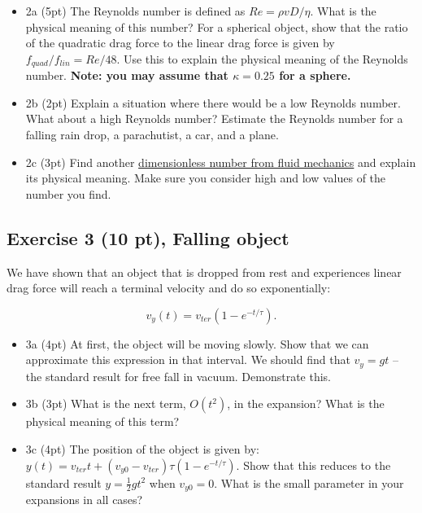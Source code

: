 \documentclass[11pt]{article}
\providecommand{\tightlist}{%
      \setlength{\itemsep}{0pt}\setlength{\parskip}{0pt}}
\begin{document}
\begin{itemize}
\tightlist
\item
  2a (5pt) The Reynolds number is defined as \(Re = \rho v D / \eta\).
  What is the physical meaning of this number? For a spherical object,
  show that the ratio of the quadratic drag force to the linear drag
  force is given by \(f_{quad}/f_{lin} = Re/48\). Use this to explain
  the physical meaning of the Reynolds number. \textbf{Note: you may
  assume that \(\kappa = 0.25\) for a sphere.}
\item
  2b (2pt) Explain a situation where there would be a low Reynolds
  number. What about a high Reynolds number? Estimate the Reynolds
  number for a falling rain drop, a parachutist, a car, and a plane.
\item
  2c (3pt) Find another
  \href{https://en.wikipedia.org/wiki/Dimensionless_numbers_in_fluid_mechanics}{dimensionless
  number from fluid mechanics} and explain its physical meaning. Make
  sure you consider high and low values of the number you find.
\end{itemize}

    \subsection{Exercise 3 (10 pt), Falling
object}\label{exercise-3-10-pt-falling-object}

We have shown that an object that is dropped from rest and experiences
linear drag force will reach a terminal velocity and do so
exponentially:

\[v_y(t) = v_{ter}(1-e^{-t/\tau}).\]

\begin{itemize}
\tightlist
\item
  3a (4pt) At first, the object will be moving slowly. Show that we can
  approximate this expression in that interval. We should find that
  \(v_y = gt\) -- the standard result for free fall in vacuum.
  Demonstrate this.
\item
  3b (3pt) What is the next term, \(O(t^2)\), in the expansion? What is
  the physical meaning of this term?
\item
  3c (4pt) The position of the object is given by:
  \(y(t) = v_{ter}t + (v_{y0}-v_{ter})\tau(1-e^{-t/\tau})\). Show that
  this reduces to the standard result \(y = \frac{1}{2}gt^2\) when
  \(v_{y0} = 0\). What is the small parameter in your expansions in all
  cases?
\end{itemize}
\end{document}
